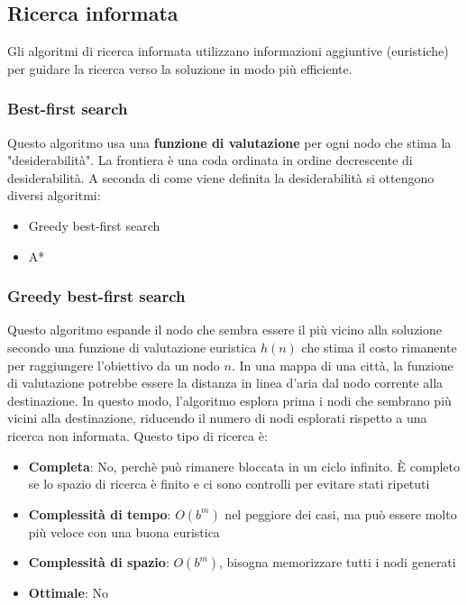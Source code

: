 \documentclass[a4paper]{article}
\begin{document}
\subsection{Ricerca informata}
Gli algoritmi di ricerca informata utilizzano informazioni aggiuntive (euristiche)
per guidare la ricerca verso la soluzione in modo più efficiente.

\subsubsection{Best-first search}
Questo algoritmo usa una \textbf{funzione di valutazione} per ogni nodo che stima la
"desiderabilità". La frontiera è una coda ordinata in ordine decrescente di desiderabilità.
A seconda di come viene definita la desiderabilità si ottengono diversi algoritmi:
\begin{itemize}
  \item Greedy best-first search
  \item A*
\end{itemize}

\subsubsection{Greedy best-first search}
Questo algoritmo espande il nodo che sembra essere il più vicino alla soluzione
secondo una funzione di valutazione euristica \( h(n) \) che stima il costo
rimanente per raggiungere l'obiettivo da un nodo \( n \).
\ex{}
{
  In una mappa di una città, la funzione di valutazione potrebbe essere la distanza
  in linea d'aria dal nodo corrente alla destinazione. In questo modo, l'algoritmo
  esplora prima i nodi che sembrano più vicini alla destinazione, riducendo il numero
  di nodi esplorati rispetto a una ricerca non informata.
}
Questo tipo di ricerca è:
\begin{itemize}
  \item \textbf{Completa}: No, perchè può rimanere bloccata in un ciclo infinito. È
    completo se lo spazio di ricerca è finito e ci sono controlli per evitare stati
    ripetuti
  \item \textbf{Complessità di tempo}: \( O(b^m) \) nel peggiore dei casi, ma può essere
    molto più veloce con una buona euristica
  \item \textbf{Complessità di spazio}: \( O(b^m) \), bisogna memorizzare tutti i nodi
    generati
  \item \textbf{Ottimale}: No
\end{itemize}
\end{document}
